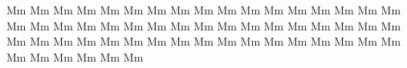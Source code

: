 \documentclass{worksheet}
\begin{document}
\begin{drillsheet}
\calligra
Mm Mm Mm Mm Mm Mm Mm Mm Mm Mm Mm Mm Mm Mm Mm Mm Mm Mm Mm Mm Mm Mm Mm Mm Mm Mm Mm Mm Mm Mm Mm Mm Mm Mm Mm Mm Mm Mm Mm Mm Mm Mm Mm Mm Mm Mm Mm Mm Mm Mm Mm Mm Mm Mm Mm Mm Mm
\end{drillsheet}
\end{document}
